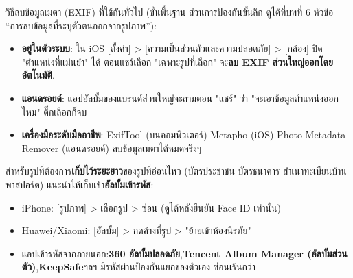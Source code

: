วิธีลบข้อมูลเมตา (EXIF) ที่ใช้กันทั่วไป (ขั้นพื้นฐาน ส่วนการป้องกันขั้นลึก ดูได้ที่บทที่ 6 หัวข้อ “การลบข้อมูลที่ระบุตัวตนออกจากรูปภาพ”):

\begin{itemize}
  \item \textbf{อยู่ในตัวระบบ}: ใน iOS [ตั้งค่า] > [ความเป็นส่วนตัวและความปลอดภัย] > [กล้อง] ปิด "ตำแหน่งที่แม่นยำ" ได้ ตอนแชร์เลือก "เฉพาะรูปที่เลือก" จะ\textbf{ลบ EXIF ส่วนใหญ่ออกโดยอัตโนมัติ}.
  \item \textbf{แอนดรอยด์}: แอปอัลบั้มของแบรนด์ส่วนใหญ่จะถามตอน "แชร์" ว่า "จะเอาข้อมูลตำแหน่งออกไหม" ติ๊กเลือกก็จบ
  \item \textbf{เครื่องมือระดับมืออาชีพ}: ExifTool (บนคอมพิวเตอร์) Metapho (iOS) Photo Metadata Remover (แอนดรอยด์) ลบข้อมูลเมตาได้หมดจริงๆ
\end{itemize}

สำหรับรูปที่ต้องการ\textbf{เก็บไว้ระยะยาว}ของรูปที่อ่อนไหว (บัตรประชาชน บัตรธนาคาร สำเนาทะเบียนบ้าน พาสปอร์ต) แนะนำให้เก็บเข้า\textbf{อัลบั้มเข้ารหัส}:

\begin{itemize}
  \item iPhone: [รูปภาพ] > เลือกรูป > ซ่อน (ดูได้หลังยืนยัน Face ID เท่านั้น)
  \item Huawei/Xiaomi: [อัลบั้ม] > กดค้างที่รูป > "ย้ายเข้าห้องนิรภัย"
  \item แอปเข้ารหัสจากภายนอก:\textbf{360 อัลบั้มปลอดภัย},\textbf{Tencent Album Manager (อัลบั้มส่วนตัว)},\textbf{KeepSafe}ฯลฯ มีรหัสผ่านป้องกันแยกของตัวเอง ซ่อนเร้นกว่า
\end{itemize}
